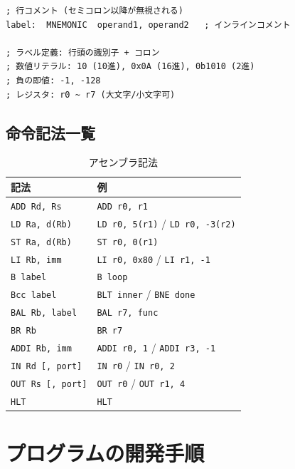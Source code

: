 \documentclass[a4paper,11pt]{ltjsarticle}
\begin{document}
\begin{lstlisting}[language={},caption={アセンブリ言語の文法}]
; 行コメント (セミコロン以降が無視される)
label:  MNEMONIC  operand1, operand2   ; インラインコメント

; ラベル定義: 行頭の識別子 + コロン
; 数値リテラル: 10 (10進), 0x0A (16進), 0b1010 (2進)
; 負の即値: -1, -128
; レジスタ: r0 ~ r7 (大文字/小文字可)
\end{lstlisting}

\subsection{命令記法一覧}

\begin{table}[h]
\centering
\caption{アセンブラ記法}
\small
\begin{tabular}{ll}
\toprule
記法 & 例 \\
\midrule
\texttt{ADD Rd, Rs}      & \texttt{ADD r0, r1} \\
\texttt{LD Ra, d(Rb)}    & \texttt{LD r0, 5(r1)} / \texttt{LD r0, -3(r2)} \\
\texttt{ST Ra, d(Rb)}    & \texttt{ST r0, 0(r1)} \\
\texttt{LI Rb, imm}      & \texttt{LI r0, 0x80} / \texttt{LI r1, -1} \\
\texttt{B label}          & \texttt{B loop} \\
\texttt{Bcc label}        & \texttt{BLT inner} / \texttt{BNE done} \\
\texttt{BAL Rb, label}    & \texttt{BAL r7, func} \\
\texttt{BR Rb}            & \texttt{BR r7} \\
\texttt{ADDI Rb, imm}     & \texttt{ADDI r0, 1} / \texttt{ADDI r3, -1} \\
\texttt{IN Rd [, port]}   & \texttt{IN r0} / \texttt{IN r0, 2} \\
\texttt{OUT Rs [, port]}  & \texttt{OUT r0} / \texttt{OUT r1, 4} \\
\texttt{HLT}              & \texttt{HLT} \\
\bottomrule
\end{tabular}
\end{table}


\section{プログラムの開発手順}
\end{document}
